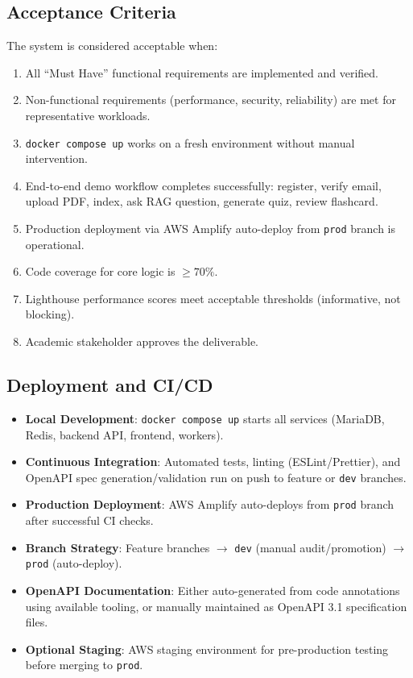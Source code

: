\documentclass[12pt,a4paper]{article}
\begin{document}
\subsection{Acceptance Criteria}

The system is considered acceptable when:

\begin{enumerate}
    \item All ``Must Have'' functional requirements are implemented and verified.
    \item Non-functional requirements (performance, security, reliability) are met for representative workloads.
    \item \texttt{docker compose up} works on a fresh environment without manual intervention.
    \item End-to-end demo workflow completes successfully: register, verify email, upload PDF, index, ask RAG question, generate quiz, review flashcard.
    \item Production deployment via AWS Amplify auto-deploy from \texttt{prod} branch is operational.
    \item Code coverage for core logic is $\geq 70\%$.
    \item Lighthouse performance scores meet acceptable thresholds (informative, not blocking).
    \item Academic stakeholder approves the deliverable.
\end{enumerate}

\subsection{Deployment and CI/CD}

\begin{itemize}
    \item \textbf{Local Development}: \texttt{docker compose up} starts all services (MariaDB, Redis, backend API, frontend, workers).
    \item \textbf{Continuous Integration}: Automated tests, linting (ESLint/Prettier), and OpenAPI spec generation/validation run on push to feature or \texttt{dev} branches.
    \item \textbf{Production Deployment}: AWS Amplify auto-deploys from \texttt{prod} branch after successful CI checks.
    \item \textbf{Branch Strategy}: Feature branches $\to$ \texttt{dev} (manual audit/promotion) $\to$ \texttt{prod} (auto-deploy).
    \item \textbf{OpenAPI Documentation}: Either auto-generated from code annotations using available tooling, or manually maintained as OpenAPI 3.1 specification files.
    \item \textbf{Optional Staging}: AWS staging environment for pre-production testing before merging to \texttt{prod}.
\end{itemize}
\end{document}
